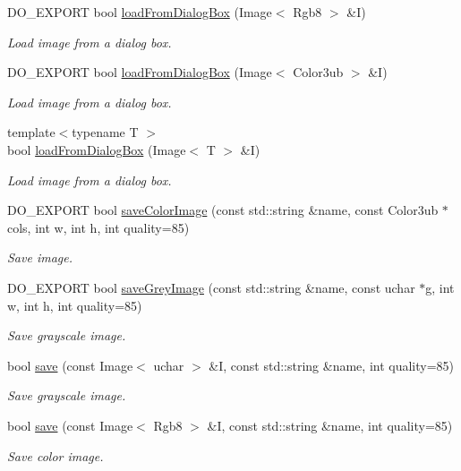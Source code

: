 \begin{DoxyCompactItemize}
D\-O\-\_\-\-E\-X\-P\-O\-R\-T bool \hyperlink{group___image_i_o_ga4a26960f04d5aa85afb1883f7fd6956b}{load\-From\-Dialog\-Box} (Image$<$ Rgb8 $>$ \&I)
\begin{DoxyCompactList}\small\item\em Load image from a dialog box. \end{DoxyCompactList}\item 
D\-O\-\_\-\-E\-X\-P\-O\-R\-T bool \hyperlink{group___image_i_o_ga5fead3977bbe969d001d0abd115fe4b5}{load\-From\-Dialog\-Box} (Image$<$ Color3ub $>$ \&I)
\begin{DoxyCompactList}\small\item\em Load image from a dialog box. \end{DoxyCompactList}\item 
{\footnotesize template$<$typename T $>$ }\\bool \hyperlink{group___image_i_o_ga3fb8d2fc4fd39bbf6352d316fd656bea}{load\-From\-Dialog\-Box} (Image$<$ T $>$ \&I)
\begin{DoxyCompactList}\small\item\em Load image from a dialog box. \end{DoxyCompactList}\item 
D\-O\-\_\-\-E\-X\-P\-O\-R\-T bool \hyperlink{group___image_i_o_gaa3b2869a4d9540ce1f273ae2c628964e}{save\-Color\-Image} (const std\-::string \&name, const Color3ub $\ast$cols, int w, int h, int quality=85)
\begin{DoxyCompactList}\small\item\em Save image. \end{DoxyCompactList}\item 
D\-O\-\_\-\-E\-X\-P\-O\-R\-T bool \hyperlink{group___image_i_o_ga466864eb2eeba5e29bf95d08b452e629}{save\-Grey\-Image} (const std\-::string \&name, const uchar $\ast$g, int w, int h, int quality=85)
\begin{DoxyCompactList}\small\item\em Save grayscale image. \end{DoxyCompactList}\item 
bool \hyperlink{group___image_i_o_gaff61fd0f339b25764e9d891130954a69}{save} (const Image$<$ uchar $>$ \&I, const std\-::string \&name, int quality=85)
\begin{DoxyCompactList}\small\item\em Save grayscale image. \end{DoxyCompactList}\item 
bool \hyperlink{group___image_i_o_ga7aae26b551495f7b9992a69d6d80a9c0}{save} (const Image$<$ Rgb8 $>$ \&I, const std\-::string \&name, int quality=85)
\begin{DoxyCompactList}\small\item\em Save color image. \end{DoxyCompactList}\end{DoxyCompactItemize}


